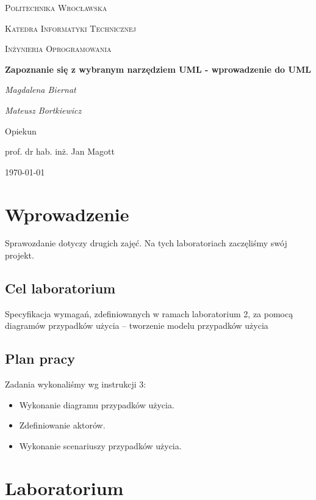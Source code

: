 \documentclass{article}
\begin{document}
	
	\begin{titlepage}
		\centering
		{\scshape\LARGE Politechnika Wrocławska \par}
		{\scshape\Large Katedra Informatyki Technicznej\par}
		
		\vspace{1cm}
		{\scshape\Large Inżynieria Oprogramowania\par}
		\vspace{1.5cm}
		{\huge\bfseries Zapoznanie się z wybranym narzędziem UML - wprowadzenie do UML\par}
		\vspace{2cm}
		{\Large\itshape Magdalena Biernat\par}
		{\Large\itshape Mateusz Bortkiewicz\par}
		\vfill
		Opiekun\par
		prof. dr hab. inż. Jan Magott 
		
		\vfill
		{\large \today\par}
	\end{titlepage}
	\newpage
	
	\section{Wprowadzenie}
	Sprawozdanie dotyczy drugich zajęć. Na tych laboratoriach zaczęliśmy swój projekt. 
	
	\subsection{Cel laboratorium}
Specyfikacja wymagań, zdefiniowanych w ramach laboratorium 2, za pomocą diagramów przypadków użycia – tworzenie modelu
przypadków użycia 
	
	\subsection{Plan pracy}
	Zadania wykonaliśmy wg instrukcji 3:

	\begin{itemize}
		\item Wykonanie diagramu przypadków użycia.
		\item Zdefiniowanie aktorów.
		\item Wykonanie scenariuszy przypadków użycia.
	\end{itemize}
\newpage
	\section{Laboratorium}
\end{document}
